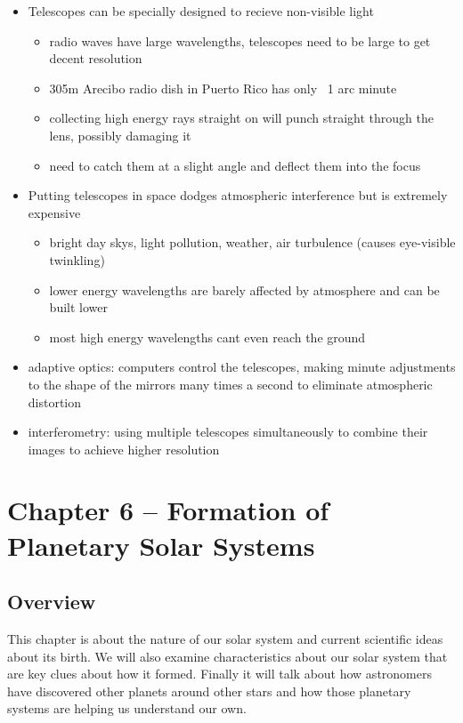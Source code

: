 \documentclass[12pt]{article}
\begin{document}
\begin{itemize}
\item Telescopes can be specially designed to recieve non-visible light
\begin{itemize}
\item radio waves have large wavelengths, telescopes need to be large to get decent resolution
\item 305m Arecibo radio dish in Puerto Rico has only ~1 arc minute
\item collecting high energy rays straight on will punch straight through the lens, possibly damaging it
\item need to catch them at a slight angle and deflect them into the focus
\end{itemize}
\item Putting telescopes in space dodges atmospheric interference but is extremely expensive
\begin{itemize}
\item bright day skys, light pollution, weather, air turbulence (causes eye-visible twinkling)
\item lower energy wavelengths are barely affected by atmosphere and can be built lower
\item most high energy wavelengths cant even reach the ground
\end{itemize}
\item adaptive optics: computers control the telescopes, making minute adjustments to the shape of the mirrors many times a second to eliminate atmospheric distortion
\item interferometry: using multiple telescopes simultaneously to combine their images to achieve higher resolution
\end{itemize}

\section{Chapter 6 -- Formation of Planetary Solar Systems}
\subsection{Overview}
This chapter is about the nature of our solar system and current scientific ideas about its birth. We will also examine characteristics about our solar system that are key clues about how it formed. Finally it will talk about how astronomers have discovered other planets around other stars and how those planetary systems are helping us understand our own.
\end{document}
